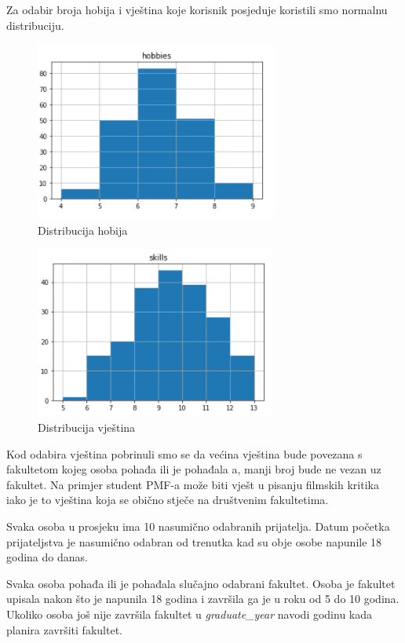 \documentclass[titlepage, 12pt]{scrartcl}
\begin{document}
Za odabir broja hobija i vještina koje korisnik posjeduje koristili smo normalnu distribuciju.
\newpage
\begin{figure}[h]
    \centering
    \includegraphics{slike/Hobbies_distribution.png}
    \caption{Distribucija hobija}
    \label{fig:hobbies}
\end{figure}

\begin{figure}[h]
    \centering
    \includegraphics{slike/Skills_distribution.png}
    \caption{Distribucija vještina}
    \label{fig:skills}
\end{figure}
Kod odabira vještina pobrinuli smo se da većina vještina bude povezana s fakultetom kojeg osoba pohađa ili je pohađala a, manji broj bude ne vezan uz fakultet. Na primjer student PMF-a može biti vješt u pisanju filmskih kritika iako je to vještina koja se obično stječe na društvenim fakultetima.

Svaka osoba u prosjeku ima 10 nasumično odabranih prijatelja. Datum početka prijateljstva je nasumično odabran od trenutka kad su obje osobe napunile 18 godina do danas.

Svaka osoba pohađa ili je pohađala slučajno odabrani fakultet. Osoba je fakultet upisala nakon što je napunila 18 godina i završila ga je u roku od 5 do 10 godina. Ukoliko osoba još nije završila fakultet u \emph{graduate\_year} navodi godinu kada planira završiti fakultet.
\end{document}
